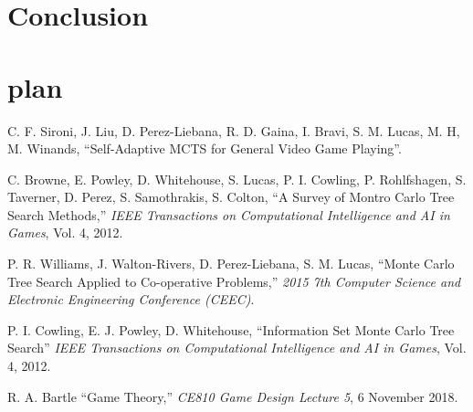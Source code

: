 \section{Conclusion}
\section{plan}

\begin{thebibliography}{9}

C. F. Sironi, J. Liu, D. Perez-Liebana, R. D. Gaina, I. Bravi, S. M. Lucas, M. H, M. Winands, ``Self-Adaptive MCTS for General Video Game Playing''. 

C. Browne, E. Powley, D. Whitehouse, S. Lucas, P. I. Cowling, P. Rohlfshagen, S. Taverner, D. Perez, S. Samothrakis, S. Colton,  
``A Survey of Montro Carlo Tree Search Methods,'' 
{\em IEEE Transactions on Computational Intelligence and AI in Games}, Vol. 4, 2012.

P. R. Williams, J. Walton-Rivers, D. Perez-Liebana, S. M. Lucas, ``Monte Carlo Tree Search Applied to Co-operative Problems,'' {\em 2015 7th Computer Science and Electronic Engineering Conference (CEEC)}.

P. I. Cowling, E. J. Powley, D. Whitehouse, 
``Information Set Monte Carlo Tree Search'' 
{\em IEEE Transactions on Computational Intelligence and AI in Games}, Vol. 4, 2012.

R. A. Bartle ``Game Theory,'' {\em CE810 Game Design Lecture 5}, 6 November 2018. 


\end{thebibliography}


